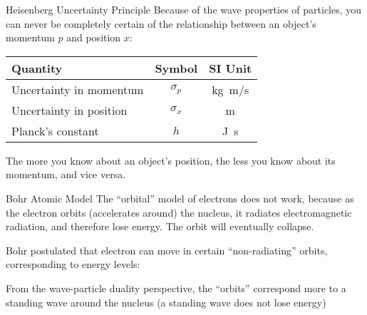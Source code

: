 \documentclass[12pt,compress,aspectratio=169]{beamer}
\newcommand{\eq}[2]{\vspace{#1}{\Large\begin{displaymath}#2\end{displaymath}}}
\begin{document}
\begin{frame}{Heisenberg Uncertainty Principle}
  Because of the wave properties of particles, you can never be completely
  certain of the relationship between an object's momentum $p$ and position
  $x$:

  \eq{-.2in}{
    \boxed{\sigma_p\sigma_x\geq \frac{h}{4\pi}}
  }
  \begin{center}
    \begin{tabular}{l|c|c}
      \rowcolor{pink}
      \textbf{Quantity} & \textbf{Symbol} & \textbf{SI Unit} \\ \hline
      Uncertainty in momentum & $\sigma_p$ & \si{\kilo\gram.\metre/\second}\\
      Uncertainty in position & $\sigma_x$ & \si{\metre} \\
      Planck's constant       & $h$        & \si{\joule\second}
    \end{tabular}
  \end{center}
  The more you know about an object's position, the less you know about its
  momentum, and vice versa.
\end{frame}




\begin{frame}{Bohr Atomic  Model}
  The ``orbital'' model of electrons does not work, because as the electron
  orbits (accelerates around) the nucleus, it radiates electromagnetic
  radiation, and therefore lose energy. The orbit will eventually collapse.

  \vspace{.1in} Bohr postulated that electron can move in certain
  ``non-radiating'' orbits, corresponding to energy levels:

  \eq{-.1in}{
    \boxed{E_n=-\frac{k^2e^4m}{2\hbar^2}\frac{Z^2}{n^2}}
  }
  
  From the wave-particle duality perspective, the ``orbits'' correspond more to
  a standing wave around the nucleus (a standing wave does not lose energy)
\end{frame}
\end{document}
